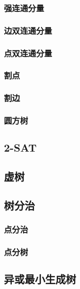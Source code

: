 \documentclass[twocolumn,a4paper]{article}  %
\begin{document}
\subsubsection{强连通分量}

\subsubsection{边双连通分量}

\subsubsection{点双连通分量}

\subsubsection{割点}

\subsubsection{割边}

\subsubsection{圆方树}

\subsection{2-SAT}

\subsection{虚树}
\subsection{树分治}
\subsubsection{点分治}

\subsubsection{点分树}


\subsection{异或最小生成树}

\newpage
\end{document}
